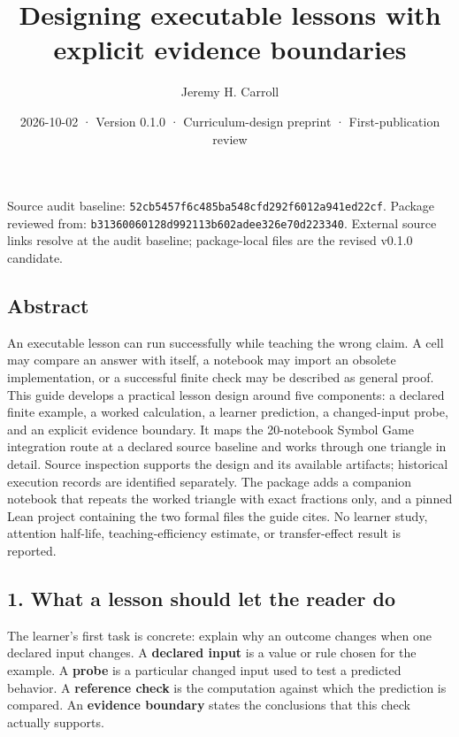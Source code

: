 \documentclass[
  11pt,
]{article}
\title{Designing executable lessons with explicit evidence boundaries}
\author{Jeremy H. Carroll}
\date{2026-10-02 · Version 0.1.0 · Curriculum-design preprint · First-publication review}
\begin{document}
\makeatletter
\begin{center}
{\LARGE \@title\par}
\vspace{0.8em}
{\normalsize \@author\par}
\vspace{0.5em}
{\small \@date\par}
\end{center}
\makeatother

Source audit baseline:
\texttt{\nolinkurl{52cb5457f6c485ba548cfd292f6012a941ed22cf}}.
Package reviewed from:
\texttt{\nolinkurl{b31360060128d992113b602adee326e70d223340}}.
External source links resolve at the audit baseline; package-local files
are the revised v0.1.0 candidate.

\hypertarget{abstract}{%
\subsection{Abstract}\label{abstract}}

An executable lesson can run successfully while teaching the wrong
claim. A cell may compare an answer with itself, a notebook may import
an obsolete implementation, or a successful finite check may be
described as general proof. This guide develops a practical lesson
design around five components: a declared finite example, a worked
calculation, a learner prediction, a changed-input probe, and an
explicit evidence boundary. It maps the 20-notebook Symbol Game
integration route at a declared source baseline and works through one
triangle in detail. Source inspection supports the design and its
available artifacts; historical execution records are identified
separately. The package adds a companion notebook that repeats the
worked triangle with exact fractions only, and a pinned Lean project
containing the two formal files the guide cites. No learner study,
attention half-life, teaching-efficiency estimate, or transfer-effect
result is reported.

\hypertarget{what-a-lesson-should-let-the-reader-do}{%
\subsection{1. What a lesson should let the reader
do}\label{what-a-lesson-should-let-the-reader-do}}

The learner's first task is concrete: explain why an outcome changes
when one declared input changes. A \textbf{declared input} is a value or
rule chosen for the example. A \textbf{probe} is a particular changed
input used to test a predicted behavior. A \textbf{reference check} is
the computation against which the prediction is compared. An
\textbf{evidence boundary} states the conclusions that this check
actually supports.
\end{document}

